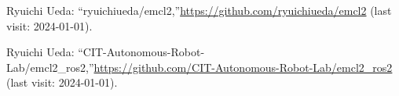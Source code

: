 \documentclass[twocolumn,9pt]{jsproceedings}
\begin{document}
\footnotesize
\begin{thebibliography}{99}










Ryuichi Ueda: ``ryuichiueda/emcl2,''\url{https://github.com/ryuichiueda/emcl2} (last visit: 2024-01-01).

Ryuichi Ueda: ``CIT-Autonomous-Robot-Lab/emcl2\_ros2,''\url{https://github.com/CIT-Autonomous-Robot-Lab/emcl2_ros2} (last visit: 2024-01-01).



\end{thebibliography}
\end{document}
